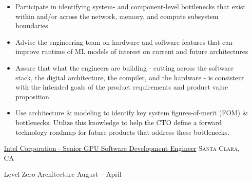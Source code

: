 \documentclass[10pt,a4paper]{article}
\begin{document}
{{{\begin{itemize}
    \item Participate in identifying system- and component-level bottlenecks that exist within and/or across the network, memory, and compute subsystem boundaries

    \item Advise the engineering team on hardware and software features that can improve runtime of ML models of interest on current and future architectures

    \item Assure that what the engineers are building - cutting across the software stack, the digital architecture, the compiler, and the hardware - is consistent with the intended goals of the product requirements and product value proposition

    \item Use architecture \& modeling to identify key system figures-of-merit (FOM) \& bottlenecks. Utilize this knowledge to help the CTO define a forward technology roadmap for future products that address these bottlenecks.

  \end{itemize}
  }}

}

\headedsection  %
  {\href{https://www.intel.com/content/www/us/en/homepage.html}{Intel Corporation - Senior GPU Software Development Engineer}}
  {\textsc{Santa Clara, CA}} {

  \headedsubsection
  {Level Zero Architecture}
  {August  -- April }
  {}

}
\end{document}
